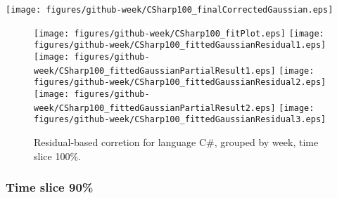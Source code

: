 \begin{center}
{\texttt{[image: figures/github-week/CSharp100\_finalCorrectedGaussian.eps]}}
\end{center}

\FloatBarrier

\begin{figure}[t]
\centering
{}
{\texttt{[image: figures/github-week/CSharp100\_fitPlot.eps]}}
{\texttt{[image: figures/github-week/CSharp100\_fittedGaussianResidual1.eps]}}
{\texttt{[image: figures/github-week/CSharp100\_fittedGaussianPartialResult1.eps]}}
{\texttt{[image: figures/github-week/CSharp100\_fittedGaussianResidual2.eps]}}
{\texttt{[image: figures/github-week/CSharp100\_fittedGaussianPartialResult2.eps]}}
{\texttt{[image: figures/github-week/CSharp100\_fittedGaussianResidual3.eps]}}
\caption{Residual-based corretion for language C\#, grouped by week, time slice 100\%.}
\end{figure}


\FloatBarrier


\subsubsection{Time slice 90\%}

